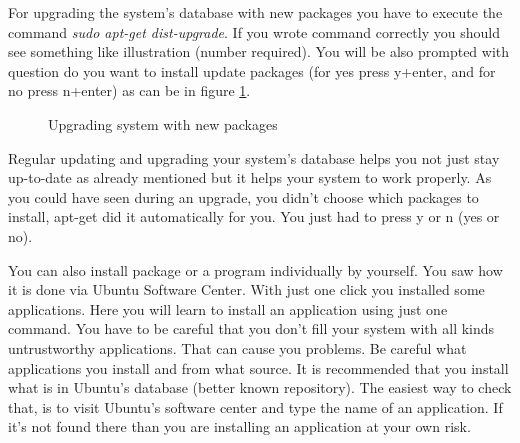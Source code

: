 \par \noindent For upgrading the system's database with new packages you have to execute the command \textit{sudo apt-get dist-upgrade}.  If you wrote command correctly you should see something like illustration (number required).  You will be also prompted with question do you want to install update packages (for yes press y+enter, and for no press n+enter) as can be in figure \ref{fig:dist-upgrade}. \\

\begin{figure}[h!]	
	\centering
	\caption{Upgrading system with new packages}	
	\label{fig:dist-upgrade}	
\end{figure}

\par \noindent Regular updating and upgrading your system's database helps you not just stay up-to-date as already mentioned but it helps your system to work properly. As you could have seen during an upgrade,  you didn't choose which packages to install, apt-get did it automatically for you. You just had to press y or n (yes or no). \\

\par \noindent You can also install package or a program individually by yourself. You saw how it is done via Ubuntu Software Center. With just one click you installed some applications. Here you will learn to install an application using just one command. You have to be careful that you don't fill your system with all kinds untrustworthy applications. That can cause you problems. Be careful what applications you install and from what source. It is recommended that you install what is in Ubuntu's database (better known repository). The easiest way to check that, is to visit Ubuntu's software center and type the name of an application. If it's not found there than you are installing an application at your own risk. \\

